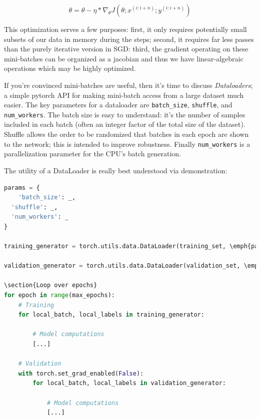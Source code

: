 \begin{equation}
    \theta = \theta - \eta*\nabla_{\theta}J\left(\theta; x^{(i:i+n)};y^{(i:i+n)}\right)    
\end{equation}


This optimization serves a few purposes: first, it only requires potentially small subsets of our data in memory during the steps; second, it requires far less passes than the purely iterative version in SGD: third, the gradient operating on these mini-batches can be organized as a jacobian and thus we have linear-algebraic operations which may be highly optimized.

If you're convinced mini-batches are useful, then it's time to discuss \emph{Dataloaders}; a simple pytorch API for making mini-batch access from a large dataset much easier. The key parameters for a dataloader are \lstinline{batch_size}, \lstinline{shuffle}, and \lstinline{num_workers}. The batch size is easy to understand: it's the number of samples included in each batch (often an integer factor of the total size of the dataset). Shuffle allows the order to be randomized that batches in each epoch are shown to the network; this is intended to improve robustness. Finally \lstinline{num_workers} is a parallelization parameter for the CPU's batch generation.

The utility of a DataLoader is really best understood via demonstration:

\begin{lstlisting}[language=Python]
params = {
	'batch_size': _,
  'shuffle': _,
  'num_workers': _
}

training_generator = torch.utils.data.DataLoader(training_set, \emph{params)

validation_generator = torch.utils.data.DataLoader(validation_set, \emph{params)

\section{Loop over epochs}
for epoch in range(max_epochs):
    # Training
    for local_batch, local_labels in training_generator:

        # Model computations
        [...]

    # Validation
    with torch.set_grad_enabled(False):
        for local_batch, local_labels in validation_generator:

            # Model computations
            [...]
            \end{lstlisting}

